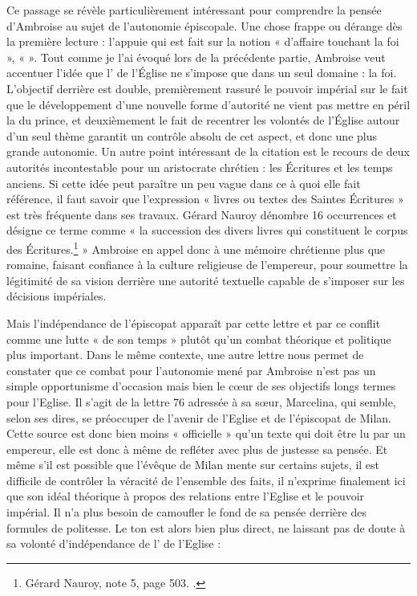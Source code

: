 \bigskip

Ce passage se révèle particulièrement intéressant pour comprendre la pensée d’Ambroise au sujet de l’autonomie épiscopale. Une chose frappe ou dérange dès la première lecture : l’appuie qui est fait sur la notion « d’affaire touchant la foi », «  ». Tout comme je l’ai évoqué lors de la précédente partie, Ambroise veut accentuer l’idée que l’ de l’Église ne s’impose que dans un seul domaine : la foi. L’objectif derrière est double, premièrement rassuré le pouvoir impérial sur le fait que le développement d’une nouvelle forme d’autorité ne vient pas mettre en péril la  du prince, et deuxièmement le fait de recentrer les volontés de l’Église autour d’un seul thème garantit un contrôle absolu de cet aspect, et donc une plus grande autonomie. Un autre point intéressant de la citation est le recours de deux autorités incontestable pour un aristocrate chrétien : les Écritures et les temps anciens. Si cette idée peut paraître un peu vague dans ce à quoi elle fait référence, il faut savoir que l’expression « livres ou textes des Saintes Écritures » est très fréquente dans ses travaux. Gérard Nauroy dénombre 16 occurrences et désigne ce terme comme « la succession des divers livres qui constituent le corpus des Écritures.\footnote{Gérard Nauroy, note 5, page 503. \cite[,3]{ambroise_lettres}.} » Ambroise en appel donc à une mémoire chrétienne plus que romaine, faisant confiance à la culture religieuse de l’empereur, pour soumettre la légitimité de sa vision derrière une autorité textuelle capable de s’imposer sur les décisions impériales.

\bigskip

Mais l’indépendance de l’épiscopat apparaît par cette lettre et par ce conflit comme une lutte « de son temps » plutôt qu’un combat théorique et politique plus important. Dans le même contexte, une autre lettre nous permet de constater que ce combat pour l’autonomie mené par Ambroise n’est pas un simple opportunisme d’occasion mais bien le cœur de ses objectifs longs termes pour l’Eglise. Il s’agit de la lettre 76 adressée à sa sœur, Marcelina, qui semble, selon ses dires, se préoccuper de l’avenir de l’Eglise et de l'épiscopat de Milan. Cette source est donc bien moins « officielle » qu’un texte qui doit être lu par un empereur, elle est donc à même de refléter avec plus de justesse sa pensée. Et même s’il est possible que l’évêque de Milan mente sur certains sujets, il est difficile de contrôler la véracité de l’ensemble des faits,  il n’exprime finalement ici que son idéal théorique à propos des relations entre l’Eglise et le pouvoir impérial. Il n’a plus besoin de camoufler le fond de sa pensée derrière des formules de politesse. Le ton est alors bien plus direct, ne laissant pas de doute à sa volonté d'indépendance de l’ de l’Eglise :

